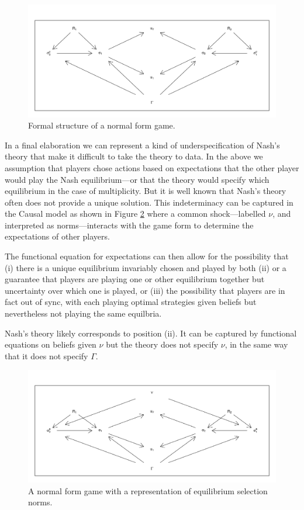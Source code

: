 \documentclass[
  12pt,
]{book}
\begin{document}
\begin{figure}

{\centering \includegraphics[width=0.8\linewidth]{ii_files/figure-latex/nfg4-1} 

}

\caption{Formal structure of a normal form game.}\label{fig:nfg4}
\end{figure}

In a final elaboration we can represent a kind of underspecification of Nash's theory that make it difficult to take the theory to data. In the above we assumption that players chose actions based on expectations that the other player would play the Nash equilibrium---or that the theory would specify which equilibrium in the case of multiplicity. But it is well known that Nash's theory often does not provide a unique solution. This indeterminacy can be captured in the Causal model as shown in Figure \ref{fig:nfg5} where a common shock---labelled \(\nu\), and interpreted as norms---interacts with the game form to determine the expectations of other players.

The functional equation for expectations can then allow for the possibility that (i) there is a unique equilibrium invariably chosen and played by both (ii) or a guarantee that players are playing one or other equilibrium together but uncertainty over which one is played, or (iii) the possibility that players are in fact out of sync, with each playing optimal strategies given beliefs but nevertheless not playing the same equilbria.

Nash's theory likely corresponds to position (ii). It can be captured by functional equations on beliefs given \(\nu\) but the theory does not specify \(\nu\), in the same way that it does not specify \(\Gamma\).

\begin{figure}

{\centering \includegraphics[width=0.8\linewidth]{ii_files/figure-latex/nfg5-1} 

}

\caption{A normal form game with a representation of equilibrium selection norms.}\label{fig:nfg5}
\end{figure}
\end{document}
